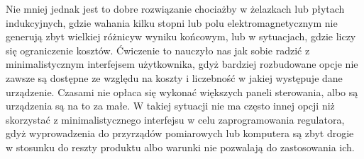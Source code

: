 \documentclass[a4paper, 12pt]{article}
\begin{document}
			\newline
			Nie mniej jednak jest to dobre rozwiązanie chociażby w żelazkach lub płytach indukcyjnych, gdzie wahania kilku stopni lub polu elektromagnetycznym nie generują zbyt wielkiej różnicy\linebreak w wyniku końcowym, lub w sytuacjach, gdzie liczy się ograniczenie kosztów.
			\newline 
			\newline
			Ćwiczenie to nauczyło nas jak sobie radzić z minimalistycznym interfejsem użytkownika, gdyż bardziej rozbudowane opcje nie zawsze są dostępne ze względu na koszty i liczebność w jakiej występuje dane urządzenie. Czasami nie opłaca się wykonać większych paneli sterowania, albo są urządzenia są na to za małe. W takiej sytuacji nie ma często innej opcji niż skorzystać z minimalistycznego interfejsu w celu zaprogramowania regulatora, gdyż wyprowadzenia do przyrządów pomiarowych lub komputera są zbyt drogie w stosunku do reszty produktu albo warunki nie pozwalają do zastosowania ich.
\end{document}
